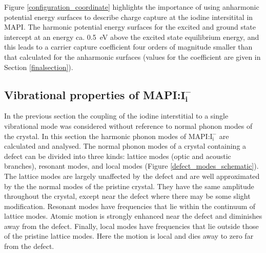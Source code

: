 Figure \ref{configuration_coordinate} highlights the importance of using anharmonic potential energy surfaces to describe charge capture at the iodine intersitital in MAPI. The harmonic potential energy surfaces for the excited and ground state intercept at an energy ca. \SI{0.5}{eV} above the excited state equilibrium energy, and this leads to a carrier capture coefficient four orders of magnitude smaller than that calculated for the anharmonic surfaces (values for the coefficient are given in Section \ref{finalsection}).

\subsection{Vibrational properties of MAPI:$\mathbf{I}_\mathbf{i}^\mathbf{-}$}

In the previous section the coupling of the iodine interstitial to a single vibrational mode was considered without reference to normal phonon modes of the crystal.
In this section the harmonic phonon modes of MAPI:$\mathrm{I}_\mathrm{i}^-$ are calculated and analysed.
The normal phonon modes of a crystal containing a defect can be divided into three kinds: lattice modes (optic and acoustic branches), resonant modes, and local modes (Figure \ref{defect_modes_schematic}).\autocite{Hayes1985}
The lattice modes are largely unaffected by the defect and are well approximated by the the normal modes of the pristine crystal. They have the same amplitude throughout the crystal, except near the defect where there may be some slight modification. 
Resonant modes have frequencies that lie within the continuum of lattice modes. Atomic motion is strongly enhanced near the defect and diminishes away from the defect.
Finally, local modes have frequencies that lie outside those of the pristine lattice modes. Here the motion is local and dies away to zero far from the defect.

